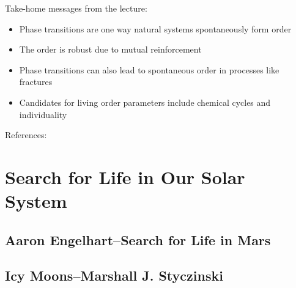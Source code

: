 \documentclass[]{article}
\begin{document}
Take-home messages from the lecture:
\begin{itemize}
	\item Phase transitions are one way natural systems  spontaneously form order
	\item The order is robust due to mutual reinforcement
	\item Phase transitions can also lead to spontaneous order in processes like fractures
	\item Candidates for living order parameters include chemical cycles and individuality
\end{itemize}

References: \cite{smith2011large,goldenfeld2018lectures,smith2015new,smith2016origin}

\section{Search for Life in Our Solar System}

\subsection[Search for Life in Mars]{Aaron Engelhart--Search for Life in Mars}

\subsection[Icy Moons]{Icy Moons--Marshall J. Styczinski}


\printglossaries

 


\end{document}
